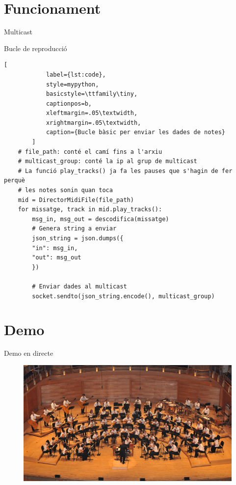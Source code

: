 \documentclass{beamer}
\begin{document}
\section{Funcionament}
\begin{frame}{Multicast}
	
\end{frame}
\begin{frame}[fragile]{Bucle de reproducció}
	\begin{lstlisting}[
			label={lst:code},
			style=mypython, 
			basicstyle=\ttfamily\tiny,
			captionpos=b,
			xleftmargin=.05\textwidth, 
			xrightmargin=.05\textwidth,
			caption={Bucle bàsic per enviar les dades de notes}
		]
	# file_path: conté el camí fins a l'arxiu
	# multicast_group: conté la ip al grup de multicast
	# La funció play_tracks() ja fa les pauses que s'hagin de fer perquè
	# les notes sonin quan toca
	mid = DirectorMidiFile(file_path)
	for missatge, track in mid.play_tracks():
		msg_in, msg_out = descodifica(missatge)
		# Genera string a enviar
		json_string = json.dumps({
		"in": msg_in,
		"out": msg_out
		})
		
		# Enviar dades al multicast
		socket.sendto(json_string.encode(), multicast_group)
	\end{lstlisting}
\end{frame}

\section{Demo}
\begin{frame}{Demo en directe}
	\begin{figure}
		\includegraphics[width=\linewidth]{images/orchestra}
	\end{figure}
\end{frame}
\end{document}
